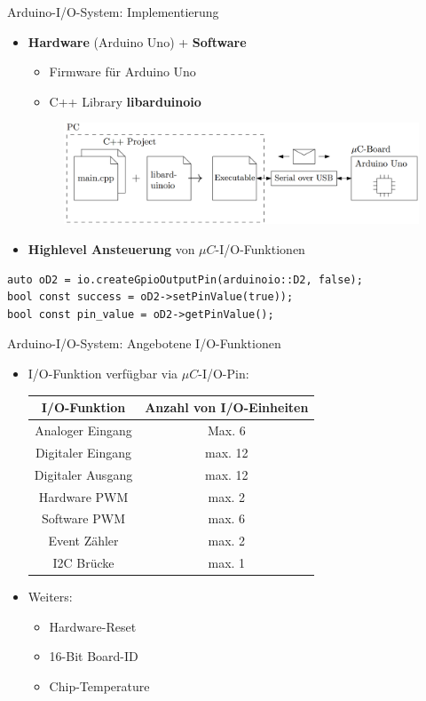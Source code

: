 \documentclass{beamer}
\begin{document}
\begin{frame}[fragile]{Arduino-I/O-System: Implementierung}
	\begin{itemize}
		\item \textbf{Hardware} (Arduino Uno) + \textbf{Software}
		\begin{itemize}
			\item Firmware f\"ur Arduino Uno
			\item C++ Library \textbf{libarduinoio}
		\end{itemize}
		\begin{figure}[htbp]
			\centering
			\includegraphics[scale=0.2]{./images/arduinoio-system-overview.png}
		\end{figure}
		\item \textbf{Highlevel Ansteuerung} von $\mu{}C$-I/O-Funktionen
	\end{itemize}
\begin{lstlisting}
auto oD2 = io.createGpioOutputPin(arduinoio::D2, false);
bool const success = oD2->setPinValue(true));
bool const pin_value = oD2->getPinValue();
\end{lstlisting}
\end{frame}
\begin{frame}{Arduino-I/O-System: Angebotene I/O-Funktionen}
	\begin{itemize}
		\item I/O-Funktion verf\"ugbar via $\mu{}C$-I/O-Pin:
		\begin{table}[htbp]
			\begin{tabular}{|c|c|}
				\hline 
				\textbf{I/O-Funktion} & \textbf{Anzahl von I/O-Einheiten} \\ 
				\hline \hline 
				Analoger Eingang & Max. 6 \\ 
				\hline 
				Digitaler Eingang & max. 12  \\ 
				\hline
				Digitaler Ausgang & max. 12 \\ 
				\hline
				Hardware PWM & max. 2 \\ 
				\hline
				Software PWM & max. 6 \\ 
				\hline
				Event Z\"ahler & max. 2 \\
				\hline
				I2C Br\"ucke & max. 1 \\
				\hline
			\end{tabular}
		\end{table}
		\item Weiters:
		\begin{itemize}
			\item Hardware-Reset
			\item 16-Bit Board-ID
			\item Chip-Temperature
		\end{itemize}
	\end{itemize}
\end{frame}
\end{document}
